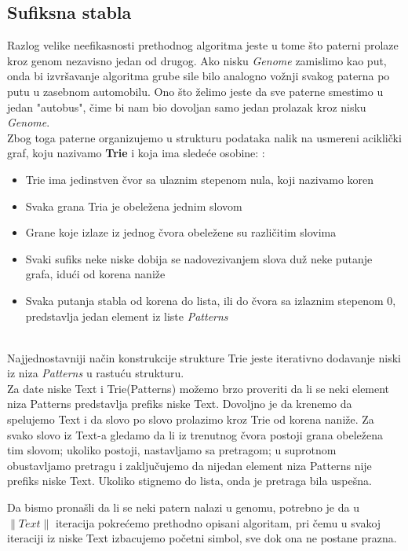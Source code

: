 \subsection{Sufiksna stabla}
Razlog velike neefikasnosti prethodnog algoritma jeste u tome što paterni prolaze kroz genom nezavisno jedan od drugog. Ako nisku \textit{Genome} zamislimo kao put, onda bi izvršavanje algoritma grube sile bilo analogno vožnji svakog paterna po putu u zasebnom automobilu. Ono što želimo jeste da sve paterne smestimo u jedan "autobus", čime bi nam bio dovoljan samo jedan prolazak kroz nisku \textit{Genome}. 
\\Zbog toga paterne organizujemo u strukturu podataka nalik na usmereni aciklički graf, koju nazivamo \textbf{Trie} i koja ima sledeće osobine:
:
\begin{itemize}
    \item Trie ima jedinstven čvor sa ulaznim stepenom nula, koji nazivamo koren
    \item Svaka grana Tria je obeležena jednim slovom
    \item Grane koje izlaze iz jednog čvora obeležene su različitim slovima
    \item Svaki sufiks neke niske dobija se nadovezivanjem slova duž neke putanje grafa, idući od korena naniže
    \item Svaka putanja stabla od korena do lista, ili do čvora sa izlaznim stepenom 0, predstavlja jedan element iz liste \textit{Patterns}\\\\
\end{itemize}

Najjednostavniji način konstrukcije strukture Trie jeste iterativno dodavanje niski iz niza \textit{Patterns} u rastuću strukturu.\\

Za date niske Text i Trie(Patterns) možemo brzo proveriti da li se neki element niza Patterns predstavlja prefiks niske Text. Dovoljno je da krenemo da spelujemo Text i da slovo po slovo prolazimo kroz Trie od korena naniže. Za svako slovo iz Text-a gledamo da li iz trenutnog čvora postoji grana obeležena tim slovom; ukoliko postoji, nastavljamo sa pretragom; u suprotnom obustavljamo pretragu i zaključujemo da nijedan element niza Patterns nije prefiks niske Text. Ukoliko stignemo do lista, onda je pretraga bila uspešna.

Da bismo pronašli da li se neki patern nalazi u genomu, potrebno je da u $\|Text\|$ iteracija pokrećemo prethodno opisani algoritam, pri čemu u svakoj iteraciji iz niske Text izbacujemo početni simbol, sve dok ona ne postane prazna.\\

